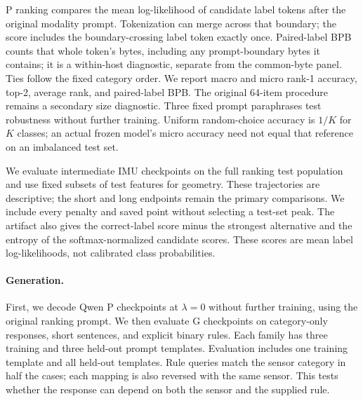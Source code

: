 \documentclass[11pt]{article}
\begin{document}
P ranking compares the mean log-likelihood of candidate label tokens after the
original modality prompt. Tokenization can merge across that boundary;
the score includes the boundary-crossing label token exactly once. Paired-label
BPB counts that whole token's bytes, including any prompt-boundary bytes it
contains; it is a within-host diagnostic, separate from the common-byte panel.
Ties follow the fixed category order. We report macro and micro rank-1 accuracy, top-2,
average rank, and paired-label BPB. The original 64-item procedure remains a
secondary size diagnostic. Three fixed prompt paraphrases test robustness
without further training. Uniform random-choice accuracy is $1/K$ for $K$
classes; an actual frozen model's micro accuracy need not equal that reference
on an imbalanced test set.

We evaluate intermediate IMU checkpoints on the full ranking test population
and use fixed subsets of test features for geometry. These trajectories are
descriptive; the short and long endpoints remain the primary comparisons. We
include every penalty and saved point without selecting a test-set peak.
The artifact also gives the correct-label score minus the strongest alternative
and the entropy of the softmax-normalized candidate scores. These scores are
mean label log-likelihoods, not calibrated class probabilities.

\paragraph{Generation.}
First, we decode Qwen P checkpoints at $\lambda=0$ without further training,
using the original ranking prompt. We then evaluate G checkpoints on category-only responses,
short sentences, and explicit binary rules. Each family has three training and
three held-out prompt templates. Evaluation includes one training template and
all held-out templates. Rule queries match the sensor category in half the
cases; each mapping is also reversed with the same sensor. This tests whether
the response can depend on both the sensor and the supplied rule.
\end{document}
